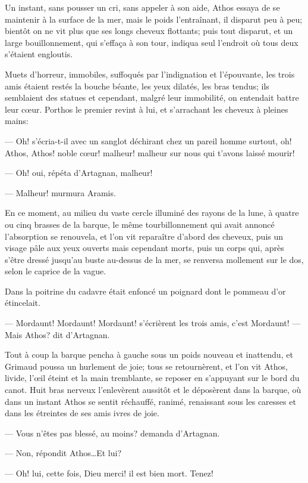 Un instant, sans pousser un cri, sans appeler à son aide, Athos essaya de se maintenir à la surface de la mer, mais le poids l'entraînant, il disparut peu à peu; bientôt on ne vit plus que ses longs cheveux flottants; puis tout disparut, et un large bouillonnement, qui s'effaça à son tour, indiqua seul l'endroit où tous deux s'étaient engloutis.

Muets d'horreur, immobiles, suffoqués par l'indignation et l'épouvante, les trois amis étaient restés la bouche béante, les yeux dilatés, les bras tendus; ils semblaient des statues et cependant, malgré leur immobilité, on entendait battre leur cœur. Porthos le premier revint à lui, et s'arrachant les cheveux à pleines mains:

— Oh! s'écria-t-il avec un sanglot déchirant chez un pareil homme surtout, oh! Athos, Athos! noble cœur! malheur! malheur sur nous qui t'avons laissé mourir!

— Oh! oui, répéta d'Artagnan, malheur!

— Malheur! murmura Aramis.

En ce moment, au milieu du vaste cercle illuminé des rayons de la lune, à quatre ou cinq brasses de la barque, le même tourbillonnement qui avait annoncé l'absorption se renouvela, et l'on vit reparaître d'abord des cheveux, puis un visage pâle aux yeux ouverts mais cependant morts, puis un corps qui, après s'être dressé jusqu'au buste au-dessus de la mer, se renversa mollement sur le dos, selon le caprice de la vague.

Dans la poitrine du cadavre était enfoncé un poignard dont le pommeau d'or étincelait.

— Mordaunt! Mordaunt! Mordaunt! s'écrièrent les trois amis, c'est Mordaunt!
— Mais Athos? dit d'Artagnan.

Tout à coup la barque pencha à gauche sous un poids nouveau et inattendu, et Grimaud poussa un hurlement de joie; tous se retournèrent, et l'on vit Athos, livide, l'œil éteint et la main tremblante, se reposer en s'appuyant sur le bord du canot. Huit bras nerveux l'enlevèrent aussitôt et le déposèrent dans la barque, où dans un instant Athos se sentit réchauffé, ranimé, renaissant sous les caresses et dans les étreintes de ses amis ivres de joie.

— Vous n'êtes pas blessé, au moins? demanda d'Artagnan.

— Non, répondit Athos\dots Et lui?

— Oh! lui, cette fois, Dieu merci! il est bien mort. Tenez!

